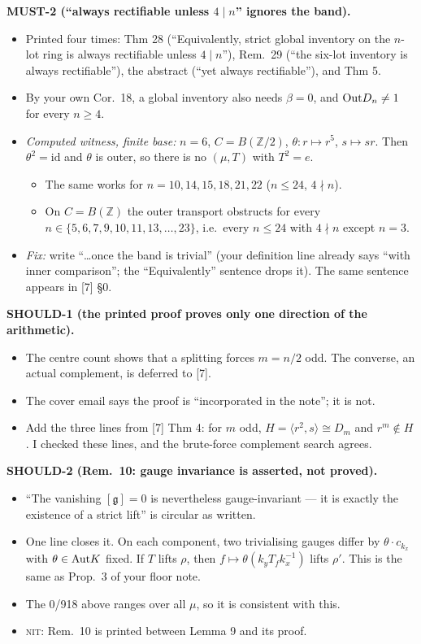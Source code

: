 \documentclass[10pt]{article}
\newcommand{\Z}{\mathbb{Z}}
\newcommand{\iss}[1]{\textsc{#1}}
\begin{document}
\textbf{MUST-2 (``always rectifiable unless $4\mid n$'' ignores the band).}
\begin{itemize}
\item Printed four times: Thm 28 (``Equivalently, strict global inventory on the $n$-lot ring is always rectifiable unless $4\mid n$''), Rem.~29 (``the six-lot inventory is always rectifiable''), the abstract (``yet always rectifiable''), and Thm 5.
\item By your own Cor.~18, a global inventory also needs $\beta=0$, and $\mathrm{Out} D_n\ne1$ for every $n\ge4$.
\item \emph{Computed witness, finite base:} $n=6$, $C=B(\Z/2)$, $\theta:r\mapsto r^5$, $s\mapsto sr$. Then $\theta^2=\mathrm{id}$ and $\theta$ is outer, so there is no $(\mu,T)$ with $T^2=e$.
\begin{itemize}
\item The same works for $n=10,14,15,18,21,22$ ($n\le24$, $4\nmid n$).
\item On $C=B(\Z)$ the outer transport obstructs for every $n\in\{5,6,7,9,10,11,13,\dots,23\}$, i.e.\ every $n\le24$ with $4\nmid n$ except $n=3$.
\end{itemize}
\item \emph{Fix:} write ``\dots once the band is trivial'' (your definition line already says ``with inner comparison''; the ``Equivalently'' sentence drops it). The same sentence appears in [7] \S0.
\end{itemize}

\textbf{SHOULD-1 (the printed proof proves only one direction of the arithmetic).}
\begin{itemize}
\item The centre count shows that a splitting forces $m=n/2$ odd. The converse, an actual complement, is deferred to [7].
\item The cover email says the proof is ``incorporated in the note''; it is not.
\item Add the three lines from [7] Thm 4: for $m$ odd, $H=\langle r^2,s\rangle\cong D_m$ and $r^m\notin H$. I checked these lines, and the brute-force complement search agrees.
\end{itemize}

\textbf{SHOULD-2 (Rem.~10: gauge invariance is asserted, not proved).}
\begin{itemize}
\item ``The vanishing $[\mathfrak g]=0$ is nevertheless gauge-invariant --- it is exactly the existence of a strict lift'' is circular as written.
\item One line closes it. On each component, two trivialising gauges differ by $\theta\cdot c_{k_x}$ with $\theta\in\mathrm{Aut} K$ fixed. If $T$ lifts $\rho$, then $f\mapsto\theta(k_yT_fk_x^{-1})$ lifts $\rho'$. This is the same as Prop.~3 of your floor note.
\item The 0/918 above ranges over all $\mu$, so it is consistent with this.
\item \iss{nit}: Rem.~10 is printed between Lemma 9 and its proof.
\end{itemize}
\end{document}
